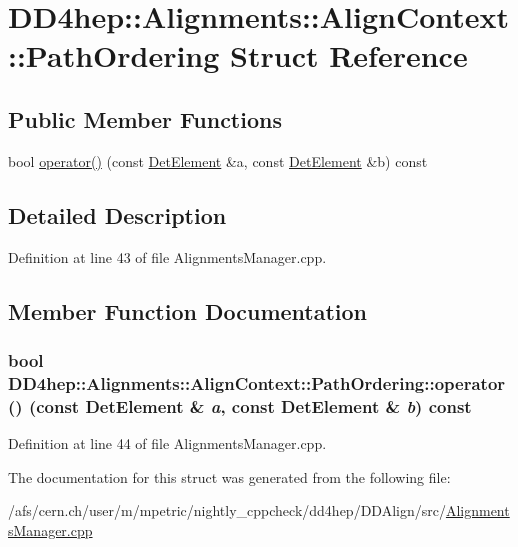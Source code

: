 \hypertarget{struct_d_d4hep_1_1_alignments_1_1_align_context_1_1_path_ordering}{
\section{DD4hep::Alignments::AlignContext::PathOrdering Struct Reference}
\label{struct_d_d4hep_1_1_alignments_1_1_align_context_1_1_path_ordering}
}
\subsection*{Public Member Functions}
\begin{DoxyCompactItemize}
\item 
bool \hyperlink{struct_d_d4hep_1_1_alignments_1_1_align_context_1_1_path_ordering_a68b21c551d7fb231d8ab93d85b1dddbe}{operator()} (const \hyperlink{namespace_d_d4hep_a21dd977310ff183f61ca6ae14b59a989}{DetElement} \&a, const \hyperlink{namespace_d_d4hep_a21dd977310ff183f61ca6ae14b59a989}{DetElement} \&b) const 
\end{DoxyCompactItemize}


\subsection{Detailed Description}


Definition at line 43 of file AlignmentsManager.cpp.

\subsection{Member Function Documentation}
\hypertarget{struct_d_d4hep_1_1_alignments_1_1_align_context_1_1_path_ordering_a68b21c551d7fb231d8ab93d85b1dddbe}{
\subsubsection[{operator()}]{\setlength{\rightskip}{0pt plus 5cm}bool DD4hep::Alignments::AlignContext::PathOrdering::operator() (const {\bf DetElement} \& {\em a}, \/  const {\bf DetElement} \& {\em b}) const}}
\label{struct_d_d4hep_1_1_alignments_1_1_align_context_1_1_path_ordering_a68b21c551d7fb231d8ab93d85b1dddbe}


Definition at line 44 of file AlignmentsManager.cpp.

The documentation for this struct was generated from the following file:\begin{DoxyCompactItemize}
\item 
/afs/cern.ch/user/m/mpetric/nightly\_\-cppcheck/dd4hep/DDAlign/src/\hyperlink{_alignments_manager_8cpp}{AlignmentsManager.cpp}\end{DoxyCompactItemize}
